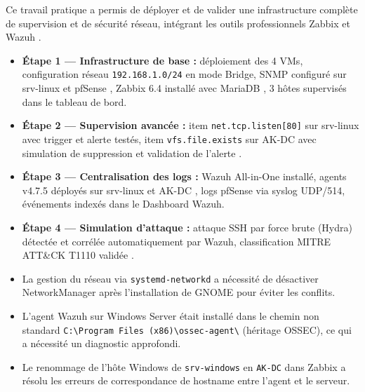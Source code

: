 \documentclass[a4paper,12pt,openany,oneside]{article}
\begin{document}

Ce travail pratique a permis de déployer et de valider une infrastructure complète de supervision et de sécurité réseau, intégrant les outils professionnels Zabbix \cite{zabbix64} et Wazuh \cite{wazuh_install}.

\begin{itemize}
    \item \textbf{Étape 1 --- Infrastructure de base :} déploiement des 4 VMs, configuration réseau \texttt{192.168.1.0/24} en mode Bridge, SNMP configuré sur srv-linux et pfSense \cite{snmp_rfc}, Zabbix 6.4 installé avec MariaDB \cite{mariadb_docs}, 3 hôtes supervisés dans le tableau de bord.

    \item \textbf{Étape 2 --- Supervision avancée :} item \texttt{net.tcp.listen[80]} sur srv-linux avec trigger et alerte testés, item \texttt{vfs.file.exists} sur AK-DC avec simulation de suppression et validation de l'alerte \cite{zabbix_agent_linux}.

    \item \textbf{Étape 3 --- Centralisation des logs :} Wazuh All-in-One installé, agents v4.7.5 déployés sur srv-linux et AK-DC \cite{wazuh_agent_windows}, logs pfSense via syslog UDP/514, événements indexés dans le Dashboard Wazuh.

    \item \textbf{Étape 4 --- Simulation d'attaque :} attaque SSH par force brute (Hydra) \cite{hydra_tool} détectée et corrélée automatiquement par Wazuh, classification MITRE ATT\&CK T1110 validée \cite{wazuh_bruteforce}.
\end{itemize}


\begin{itemize}
    \item La gestion du réseau via \texttt{systemd-networkd} a nécessité de désactiver NetworkManager après l'installation de GNOME pour éviter les conflits.
    \item L'agent Wazuh sur Windows Server était installé dans le chemin non standard \texttt{C:\textbackslash{}Program Files (x86)\textbackslash{}ossec-agent\textbackslash{}} (héritage OSSEC), ce qui a nécessité un diagnostic approfondi.
    \item Le renommage de l'hôte Windows de \texttt{srv-windows} en \texttt{AK-DC} dans Zabbix a résolu les erreurs de correspondance de hostname entre l'agent et le serveur.
\end{itemize}
\end{document}
